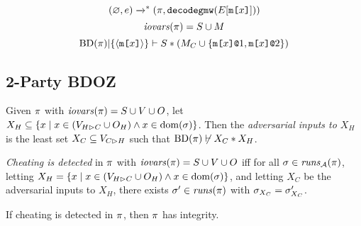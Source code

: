 \begin{lemma}
  $$ (\varnothing,e) \xrightarrow{}^{*} (\pi,\texttt{decodegmw}(E[\texttt{m[}x\texttt{]}])) $$
  $$\mathit{iovars}(\pi) = S \cup M$$
  $$\mathrm{BD}(\pi)|\{ \langle \texttt{m[}x\texttt{]} \rangle \} \vdash S * (M_C \cup \{ \texttt{m[}x\texttt{]}\texttt{@}1, \texttt{m[}x\texttt{]}\texttt{@}2 \})$$
\end{lemma}


\subsection{2-Party BDOZ}



\begin{definition}
  Given $\pi$ with $\mathit{iovars}(\pi) = S \cup V \cup O$,
  let $X_H \subseteq \{ x \mid x \in (V_{H \rhd C} \cup O_H) \wedge x \in \mathrm{dom}(\sigma) \}$.
  Then the \emph{adversarial inputs to $X_H$} is the least set
  $X_C \subseteq V_{C \rhd H}$ such that $\mathrm{BD}(\pi) \not\vdash X_C * X_H$.
\end{definition}
\begin{definition}
  \emph{Cheating is detected} in $\pi$ with $\mathit{iovars}(\pi) = S \cup V \cup O$ iff
  for all  $\sigma \in \mathit{runs}_{\mathcal{A}}(\pi)$,
  letting $X_H = \{ x \mid x \in (V_{H \rhd C} \cup O_H) \wedge x \in \mathrm{dom}(\sigma) \}$,
  and letting $X_C$ be the adversarial inputs to $X_H$,
  there exists $\sigma'\in \mathit{runs}(\pi)$
  with $\sigma_{X_C} = \sigma'_{X_C}$.  
\end{definition}

\begin{lemma}
  If cheating is detected in $\pi$, then $\pi$ has integrity.
\end{lemma}
